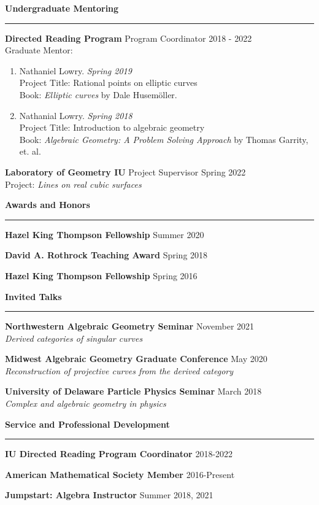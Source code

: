 \documentclass[showabstract,showacknowledgments,showpreface,showdedication,12pt]{iuphd}
\begin{document}
\noindent \textbf{Undergraduate Mentoring}
\vspace{1pt}
\hrule 
\vspace{\baselineskip}

\noindent \textbf{Directed Reading Program} \hfill Program Coordinator 2018 - 2022 \\
Graduate Mentor:
\begin{enumerate}
      \item Nathaniel Lowry. \hfill \emph{Spring 2019} \\ Project Title: Rational points on elliptic curves \\ Book: \emph{Elliptic curves} by Dale Husem\"oller. \vspace{1em}
      \item Nathanial Lowry. \hfill \emph{Spring 2018} \\ Project Title: Introduction to algebraic geometry  \\ Book: \emph{Algebraic Geometry: A Problem Solving Approach} by Thomas Garrity, et. al.
\end{enumerate}

\noindent \textbf{Laboratory of Geometry IU} \hfill Project Supervisor Spring 2022\\
Project: \emph{Lines on real cubic surfaces}

\thispagestyle{empty}
\noindent \textbf{Awards and Honors}
\vspace{1pt}
\hrule 
\vspace{\baselineskip}

\noindent \textbf{Hazel King Thompson Fellowship} \hfill Summer 2020

\noindent \textbf{David A. Rothrock Teaching Award} \hfill Spring 2018

\noindent \textbf{Hazel King Thompson Fellowship} \hfill Spring 2016

\noindent \textbf{Invited Talks}
\vspace{1pt}
\hrule 
\vspace{\baselineskip}

\noindent \textbf{Northwestern Algebraic Geometry Seminar} \hfill November 2021 \\
\emph{Derived categories of singular curves}

\noindent \textbf{Midwest Algebraic Geometry Graduate Conference} \hfill May 2020 \\
\emph{Reconstruction of projective curves from the derived category}

\noindent \textbf{University of Delaware Particle Physics Seminar} \hfill March 2018 \\
\emph{Complex and algebraic geometry in physics}

\noindent \textbf{Service and Professional Development}
\vspace{1pt}
\hrule 
\vspace{\baselineskip}

\noindent \textbf{IU Directed Reading Program Coordinator} \hfill 2018-2022 

\noindent \textbf{American Mathematical Society Member} \hfill 2016-Present

\noindent \textbf{Jumpstart: Algebra Instructor} \hfill Summer 2018, 2021 
\end{document}
